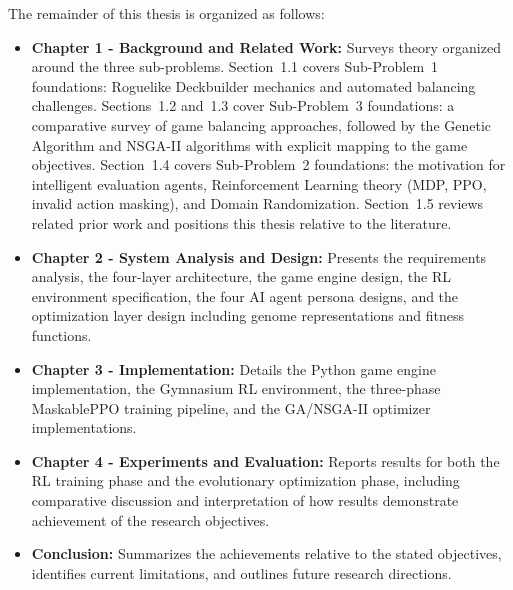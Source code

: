 The remainder of this thesis is organized as follows:
\begin{itemize}
    \item \textbf{Chapter 1 - Background and Related Work:} Surveys theory organized around the three sub-problems. Section~1.1 covers Sub-Problem~1 foundations: Roguelike Deckbuilder mechanics and automated balancing challenges. Sections~1.2 and~1.3 cover Sub-Problem~3 foundations: a comparative survey of game balancing approaches, followed by the Genetic Algorithm and NSGA-II algorithms with explicit mapping to the game objectives. Section~1.4 covers Sub-Problem~2 foundations: the motivation for intelligent evaluation agents, Reinforcement Learning theory (MDP, PPO, invalid action masking), and Domain Randomization. Section~1.5 reviews related prior work and positions this thesis relative to the literature.
    \item \textbf{Chapter 2 - System Analysis and Design:} Presents the requirements analysis, the four-layer architecture, the game engine design, the RL environment specification, the four AI agent persona designs, and the optimization layer design including genome representations and fitness functions.
    \item \textbf{Chapter 3 - Implementation:} Details the Python game engine implementation, the Gymnasium RL environment, the three-phase MaskablePPO training pipeline, and the GA/\allowbreak{}NSGA-II optimizer implementations.
    \item \textbf{Chapter 4 - Experiments and Evaluation:} Reports results for both the RL training phase and the evolutionary optimization phase, including comparative discussion and interpretation of how results demonstrate achievement of the research objectives.
    \item \textbf{Conclusion:} Summarizes the achievements relative to the stated objectives, identifies current limitations, and outlines future research directions.
\end{itemize}
